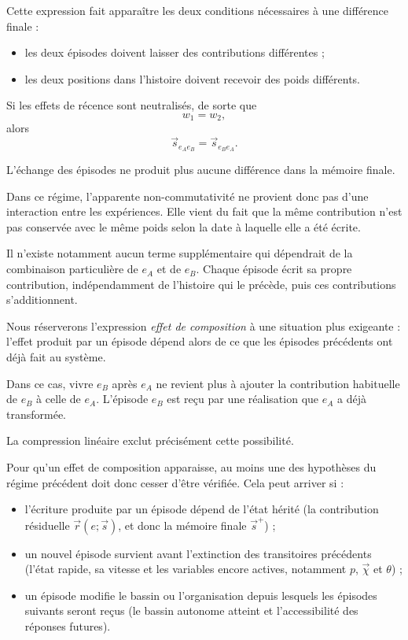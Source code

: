 Cette expression fait apparaître les deux conditions nécessaires à une différence finale :

\begin{itemize}
\tightlist
\item
  les deux épisodes doivent laisser des contributions différentes ;
\item
  les deux positions dans l'histoire doivent recevoir des poids différents.
\end{itemize}

Si les effets de récence sont neutralisés, de sorte que
\[
w_1=w_2,
\]
alors
\[
\vec s_{e_Ae_B}
=
\vec s_{e_Be_A}.
\]

L'échange des épisodes ne produit plus aucune différence dans la mémoire finale.

Dans ce régime, l'apparente non-commutativité ne provient donc pas d'une interaction entre les expériences. Elle vient du fait que la même contribution n'est pas conservée avec le même poids selon la date à laquelle elle a été écrite.

Il n'existe notamment aucun terme supplémentaire qui dépendrait de la combinaison particulière de $e_A$ et de $e_B$. Chaque épisode écrit sa propre contribution, indépendamment de l'histoire qui le précède, puis ces contributions s'additionnent.

Nous réserverons l'expression \emph{effet de composition} à une situation plus exigeante : l'effet produit par un épisode dépend alors de ce que les épisodes précédents ont déjà fait au système.

Dans ce cas, vivre $e_B$ après $e_A$ ne revient plus à ajouter la contribution habituelle de $e_B$ à celle de $e_A$. L'épisode $e_B$ est reçu par une réalisation que $e_A$ a déjà transformée.

La compression linéaire exclut précisément cette possibilité.

Pour qu'un effet de composition apparaisse, au moins une des hypothèses du régime précédent doit donc cesser d'être vérifiée. Cela peut arriver si :

\begin{itemize}
\tightlist
\item
  l'écriture produite par un épisode dépend de l'état hérité (la contribution résiduelle $\vec r(e;\vec s)$, et donc la mémoire finale $\vec s^{+}$) ;
\item
  un nouvel épisode survient avant l'extinction des transitoires précédents (l'état rapide, sa vitesse et les variables encore actives, notamment $p$, $\vec\chi$ et $\theta$) ;
\item
  un épisode modifie le bassin ou l'organisation depuis lesquels les épisodes suivants seront reçus (le bassin autonome atteint et l'accessibilité des réponses futures).
\end{itemize}

